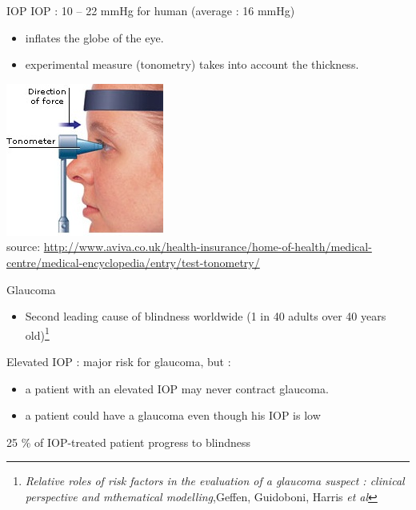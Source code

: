 \begin{frame}{IOP}
IOP : 10 -- 22 mmHg for human (average : 16 mmHg)
\begin{itemize}
\item inflates the globe of the eye.
\item experimental measure (tonometry) takes into account the thickness.
\end{itemize}
%
%
\begin{center}
\includegraphics[scale=.6]{Tonometry.jpg}\\
\tiny{source: \url{http://www.aviva.co.uk/health-insurance/home-of-health/medical-centre/medical-encyclopedia/entry/test-tonometry/}}
\end{center}
\end{frame}

\begin{frame}{Glaucoma}
\begin{itemize}
\item Second leading cause of blindness worldwide (1 in 40 adults over 40 years old)\footnote{\textit{Relative roles of risk factors in the evaluation of a glaucoma suspect : clinical perspective and mthematical modelling},Geffen, Guidoboni, Harris \textit{et al}}
\end{itemize}
Elevated IOP : major risk for glaucoma, but :
\begin{itemize}
\item a patient with an elevated IOP may never contract glaucoma.
\item a patient could have a glaucoma even though his IOP is low
\end{itemize}
\begin{center}
\alert{ 25 \% of IOP-treated patient progress to blindness}

\end{center}

\end{frame}

